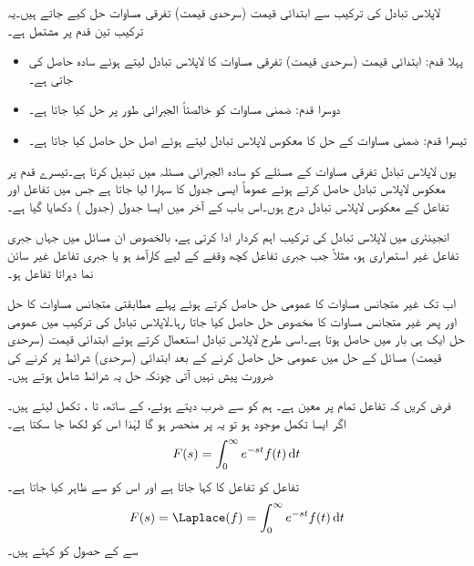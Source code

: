 لاپلاس تبادل کی ترکیب سے ابتدائی قیمت (سرحدی قیمت) تفرقی مساوات حل کیے جاتے ہیں۔یہ ترکیب تین قدم پر مشتمل ہے۔
\begin{itemize}
\item
پہلا قدم: ابتدائی قیمت (سرحدی قیمت) تفرقی مساوات کا لاپلاس تبادل لیتے ہوئے سادہ  حاصل کی جاتی ہے۔
\item
دوسرا قدم:  ضمنی مساوات کو خالصتاً الجبرائی طور پر حل کیا جاتا ہے۔
\item
تیسرا قدم: ضمنی مساوات کے حل کا معکوس لاپلاس تبادل لیتے ہوئے اصل حل حاصل کیا جاتا ہے۔
\end{itemize}  

یوں لاپلاس تبادل تفرقی مساوات کے مسئلے کو سادہ الجبرائی مسئلہ میں تبدیل کرتا ہے۔تیسرے قدم پر معکوس لاپلاس تبادل حاصل کرتے ہوئے عموماً ایسی جدول کا سہارا لیا جاتا ہے جس  میں تفاعل اور تفاعل کے معکوس لاپلاس تبادل درج ہوں۔اس باب کے آخر میں ایسا جدول (جدول ) دکھایا گیا ہے۔  

انجینئری میں لاپلاس تبادل کی ترکیب اہم کردار ادا کرتی ہے، بالخصوص ان مسائل میں جہاں جبری تفاعل غیر استمراری ہو، مثلاً جب جبری تفاعل کچھ وقفے کے لیے کارآمد ہو یا جبری تفاعل غیر سائن نما دہراتا تفاعل ہو۔

اب تک غیر متجانس مساوات کا عمومی حل حاصل کرتے ہوئے پہلے مطابقتی متجانس مساوات کا حل اور پھر غیر متجانس مساوات کا مخصوص حل حاصل کیا جاتا رہا۔لاپلاس تبادل کی ترکیب میں عمومی حل ایک ہی بار میں حاصل ہوتا ہے۔اسی طرح لاپلاس تبادل استعمال کرتے ہوئے ابتدائی قیمت (سرحدی قیمت) مسائل کے حل میں عمومی حل حاصل کرنے کے بعد ابتدائی (سرحدی) شرائط پر کرنے کی ضرورت پیش نہیں آتی چونکہ حل یہ شرائط شامل ہوتے ہیں۔

فرض کریں کہ تفاعل  تمام  پر معین ہے۔ ہم  کو  سے ضرب دیتے ہوئے،   کے ساتھ،  تا ، تکمل لیتے ہیں۔ اگر ایسا تکمل موجود ہو تو یہ  پر منحصر ہو گا لہٰذا اس کو  لکھا جا سکتا ہے۔
\begin{align}
F(s)=\int_{0}^{\infty}e^{-st}f(t)\dif t
\end{align} 
تفاعل  کو تفاعل  کا  کہا جاتا ہے اور اس کو
  سے ظاہر کیا جاتا ہے۔
\begin{align}\label{مساوات_لاپلاس_بدل_الف}
F(s)=\Laplace(f)=\int_{0}^{\infty} e^{-st} f(t)\dif t
\end{align}
 سے  کے حصول کو  کہتے ہیں۔

